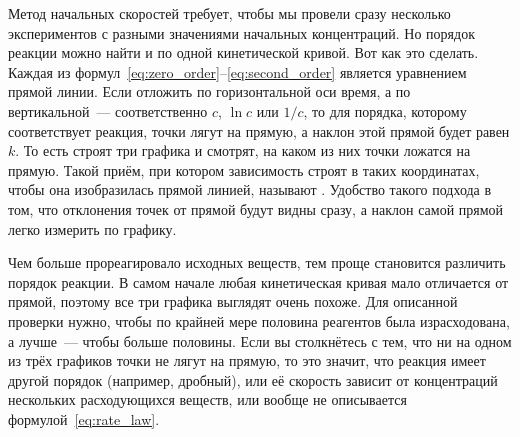 Метод начальных скоростей требует, чтобы мы провели сразу несколько экспериментов с разными значениями начальных концентраций. Но порядок реакции можно найти и по одной кинетической кривой. Вот как это сделать. Каждая из формул~\eqref{eq:zero_order}--\eqref{eq:second_order} является уравнением прямой линии. Если отложить по горизонтальной оси время, а по вертикальной~--- соответственно $c$, $\ln c$ или $1/c$, то для порядка, которому соответствует реакция, точки лягут на прямую, а наклон этой прямой будет равен $k$. То есть строят три графика и смотрят, на каком из них точки ложатся на прямую. Такой приём, при котором зависимость строят в таких координатах, чтобы она изобразилась прямой линией, называют . Удобство такого подхода в том, что отклонения точек от прямой будут видны сразу, а наклон самой прямой легко измерить по графику.

Чем больше прореагировало исходных веществ, тем проще становится различить порядок реакции. В самом начале любая кинетическая кривая мало отличается от прямой, поэтому все три графика выглядят очень похоже. Для описанной проверки нужно, чтобы по крайней мере половина реагентов была израсходована, а лучше~--- чтобы больше половины. Если вы столкнётесь с тем, что ни на одном из трёх графиков точки не лягут на прямую, то это значит, что реакция имеет другой порядок (например, дробный), или её скорость зависит от концентраций нескольких расходующихся веществ, или вообще не описывается формулой~\eqref{eq:rate_law}.

